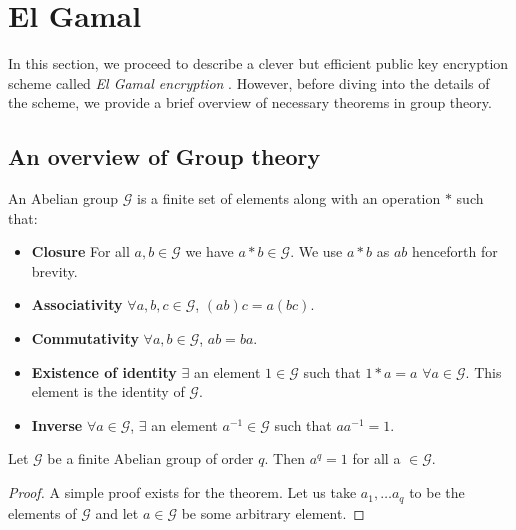 \section{El Gamal}

\label{sec:elgamal} 

In this section, we proceed to describe a clever but efficient public key encryption scheme called \textit{El Gamal encryption} \cite{Elgamal_1985}. 
However, before diving into the details of the scheme, we provide a brief overview of necessary theorems in group theory.

\subsection{An overview of Group theory}

\begin{definition}
An Abelian group $ \mathcal{G} $ is a finite set of elements along with an operation $ * $ such that:

\begin{itemize}
    \item \textbf{Closure} For all $ a, b \in \mathcal{G} $ we have $ a * b \in \mathcal{G} $. We use $ a * b $ as $ ab $ henceforth for brevity.
    \item \textbf{Associativity} $ \forall a, b, c \in \mathcal{G} $, $ (ab)c = a(bc) $.
    \item \textbf{Commutativity} $ \forall a, b \in \mathcal{G} $, $ ab = ba $.
    \item \textbf{Existence of identity} $ \exists $ an element $ 1 \in \mathcal{G} $ such that $ 1 * a = a $ $ \forall a \in \mathcal{G} $. This element is the identity of $ \mathcal{G} $.
    \item \textbf{Inverse} $ \forall a \in \mathcal{G}$, $ \exists $ an element $ a^{-1} \in \mathcal{G} $ such that $ aa^{-1} = 1 $.
\end{itemize}
\end{definition}

\begin{theorem}
Let $\mathcal{G}$ be a finite Abelian group of order $ q $. Then $ a^q = 1 $ for all a $\in \mathcal{G}$.
\end{theorem}

\begin{proof}
A simple proof exists for the theorem. Let us take $ a_1, \ldots a_q $ to be the elements of $\mathcal{G}$ and let $ a \in \mathcal{G} $ be some arbitrary element.

\end{proof}

